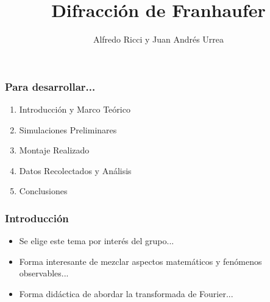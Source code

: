 \documentclass[12pt]{beamer}
\title{Difracción de Franhaufer}
\author{Alfredo Ricci y Juan Andrés Urrea}
\begin{document}
\frame{\titlepage}
\begin{frame}
\frametitle{Para desarrollar...}
\begin{block}{}
\begin{enumerate}
\item Introducción y Marco Teórico \pause
\item Simulaciones Preliminares \pause
\item Montaje Realizado \pause
\item Datos Recolectados y Análisis \pause
\item Conclusiones
\end{enumerate}
\end{block}
\end{frame}

\begin{frame}
\frametitle{Introducción}
\begin{block}{}
\begin{itemize}
\item Se elige este tema por interés del grupo... \pause
\item Forma interesante de mezclar aspectos matemáticos y fenómenos observables... \pause
\item Forma didáctica de abordar la transformada de Fourier...
\end{itemize}
\end{block}
\end{frame}
\end{document}
